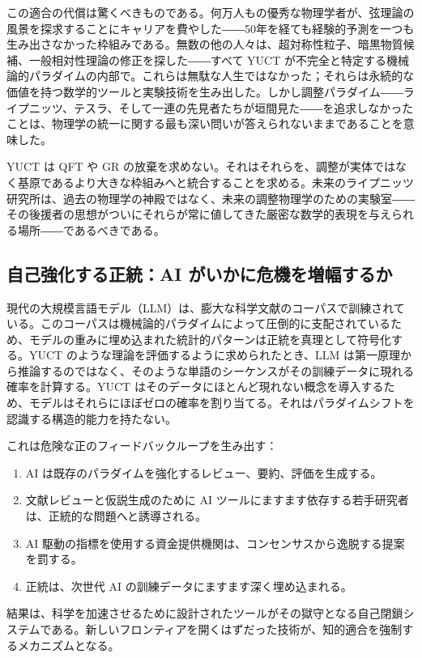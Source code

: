 \documentclass[12pt,a4paper]{article}
\begin{document}
	この適合の代償は驚くべきものである。何万人もの優秀な物理学者が、弦理論の風景を探求することにキャリアを費やした――50年を経ても経験的予測を一つも生み出さなかった枠組みである。無数の他の人々は、超対称性粒子、暗黒物質候補、一般相対性理論の修正を探した――すべて YUCT が不完全と特定する機械論的パラダイムの内部で。これらは無駄な人生ではなかった；それらは永続的な価値を持つ数学的ツールと実験技術を生み出した。しかし調整パラダイム――ライプニッツ、テスラ、そして一連の先見者たちが垣間見た――を追求しなかったことは、物理学の統一に関する最も深い問いが答えられないままであることを意味した。
	
	YUCT は QFT や GR の放棄を求めない。それはそれらを、調整が実体ではなく基原であるより大きな枠組みへと統合することを求める。未来のライプニッツ研究所は、過去の物理学の神殿ではなく、未来の調整物理学のための実験室――その後援者の思想がついにそれらが常に値してきた厳密な数学的表現を与えられる場所――であるべきである。
	
	\subsection{自己強化する正統：AI がいかに危機を増幅するか}
	
	現代の大規模言語モデル（LLM）は、膨大な科学文献のコーパスで訓練されている。このコーパスは機械論的パラダイムによって圧倒的に支配されているため、モデルの重みに埋め込まれた統計的パターンは正統を真理として符号化する。YUCT のような理論を評価するように求められたとき、LLM は第一原理から推論するのではなく、そのような単語のシーケンスがその訓練データに現れる確率を計算する。YUCT はそのデータにほとんど現れない概念を導入するため、モデルはそれらにほぼゼロの確率を割り当てる。それはパラダイムシフトを認識する構造的能力を持たない。
	
	これは危険な正のフィードバックループを生み出す：
	\begin{enumerate}
		\item AI は既存のパラダイムを強化するレビュー、要約、評価を生成する。
		\item 文献レビューと仮説生成のために AI ツールにますます依存する若手研究者は、正統的な問題へと誘導される。
		\item AI 駆動の指標を使用する資金提供機関は、コンセンサスから逸脱する提案を罰する。
		\item 正統は、次世代 AI の訓練データにますます深く埋め込まれる。
	\end{enumerate}
	結果は、科学を加速させるために設計されたツールがその獄守となる自己閉鎖システムである。新しいフロンティアを開くはずだった技術が、知的適合を強制するメカニズムとなる。
	
\end{document}

